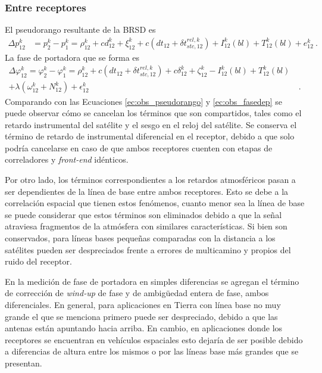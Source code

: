 \documentclass[a4paper,12pt,oneside,onecolumn,final,openright]{book}%
\begin{document}
\subsubsection{Entre receptores}
	El pseudorango resultante de la BRSD es
\begin{align}\label{ec:BRSD_pr}
	\Delta p_{12}^k &= p_2^k - p_1^k = \rho_{12}^k +cd_{12}^k + \xi_{12}^k + c\left( dt_{12} + \delta t_{stc,12}^{rel,k} \right) + I_{12}^k(bl) + T_{12}^k(bl) + e_{12}^k \ .
\end{align}
	La fase de portadora que se forma es
\begin{align}\label{ec:BRSD_fdp}
	\Delta \varphi_{12}^k = \varphi_2^k - \varphi_1^k = \rho_{12}^k + c\left( dt_{12} + \delta t_{stc,12}^{rel,k} \right) + c\delta_{12}^k + \zeta_{12}^k - I_{12}^k(bl) + T_{12}^k(bl) &\\ + \lambda \left( \omega_{12}^k + N_{12}^k \right) + \epsilon_{12}^k & \ . \nonumber
\end{align}
	Comparando con las Ecuaciones \eqref{ec:obs_pseudorango} y \eqref{ec:obs_fasedep} se puede observar cómo se cancelan los términos que son compartidos, tales como el retardo instrumental del satélite y el sesgo en el reloj del satélite. Se conserva el término de retardo de instrumental diferencial en el receptor, debido a que solo podría cancelarse en caso de que ambos receptores cuenten con etapas de correladores y \textit{front-end} idénticos.
	
	 Por otro lado, los términos correspondientes a los retardos atmosféricos pasan a ser dependientes de la línea de base entre ambos receptores. Esto se debe a la correlación espacial que tienen estos fenómenos, cuanto menor sea la línea de base se puede considerar que estos términos son eliminados debido a que la señal atraviesa fragmentos de la atmósfera con similares características. Si bien son conservados, para líneas bases pequeñas comparadas con la distancia a los satélites pueden ser despreciados frente a errores de multicamino y propios del ruido del receptor.
	
	En la medición de fase de portadora en simples diferencias se agregan el término de corrección de \textit{wind-up} de fase y de ambigüedad entera de fase, ambos diferenciales. En general, para aplicaciones en Tierra con línea base no muy grande el que se menciona primero puede ser despreciado, debido a que las antenas están apuntando hacia arriba. En cambio, en aplicaciones donde los receptores se encuentran en vehículos espaciales esto dejaría de ser posible debido a diferencias de altura entre los mismos o por las líneas base más grandes que se presentan.
	
\end{document}
